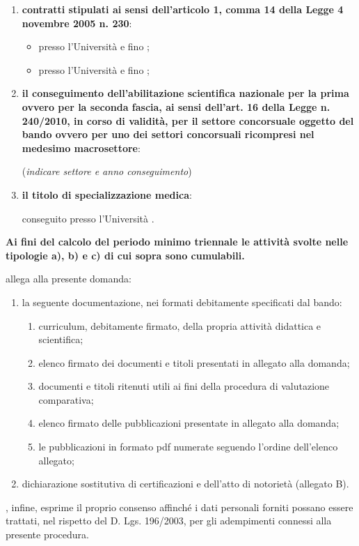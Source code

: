 \begin{enumerate}
\begin{itemize}
\begin{itemize}
\end{itemize}
\end{itemize}
\item \textbf{contratti stipulati ai sensi dell’articolo 1, comma 14 della 
Legge 4 novembre 2005 n. 230}:
\begin{itemize}
 \item presso l’Università   e fino 
 ;
 \item presso l’Università   e fino 
 ;
\end{itemize}
\item \textbf{il conseguimento dell’abilitazione scientifica nazionale per la 
prima ovvero per la seconda fascia, ai sensi dell’art. 16 della Legge n. 
240/2010, in corso di validità, per il settore concorsuale oggetto del bando 
ovvero per uno dei settori concorsuali ricompresi nel medesimo macrosettore}:

(\emph{indicare settore e anno conseguimento}) \myTextField[4cm]{}
\item \textbf{il titolo di specializzazione medica}: 

conseguito  presso l’Università .
\end{enumerate}
\textbf{Ai fini del calcolo del periodo minimo triennale le attività svolte 
nelle tipologie a), b) e c) di cui sopra sono cumulabili.}

\myTextField[.5cm]{}  allega alla presente 
domanda:
\begin{enumerate}
\item la seguente documentazione, nei formati debitamente specificati dal bando:
\begin{enumerate}[label=\emph{\roman*})]
\item curriculum, debitamente firmato, della propria attività didattica e scientifica;
\item elenco firmato dei documenti e titoli presentati in allegato alla domanda;
\item documenti e titoli ritenuti utili ai fini della procedura di valutazione 
comparativa;
\item elenco firmato delle pubblicazioni presentate in allegato alla domanda;
\item le pubblicazioni in formato pdf numerate seguendo l’ordine dell’elenco 
allegato;
\end{enumerate}
\item 	dichiarazione sostitutiva di certificazioni e dell’atto di notorietà 
(allegato B).
\end{enumerate}
\myTextField[.5cm]{} , infine, esprime il proprio 
consenso affinché i dati personali forniti possano essere trattati, nel rispetto 
del D. Lgs. 196/2003, per gli adempimenti connessi alla presente procedura.

